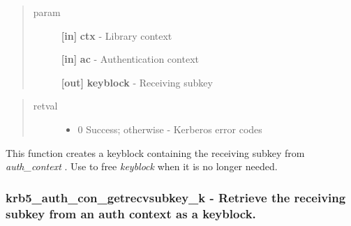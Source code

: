 \documentclass[letterpaper,10pt,english]{sphinxmanual}
\begin{document}
\begin{fulllineitems}
\label{appdev/refs/api/krb5_auth_con_getrecvsubkey:c.krb5_auth_con_getrecvsubkey}
\end{fulllineitems}

\begin{quote}\begin{description}
\item[{param}] \leavevmode
\textbf{{[}in{]}} \textbf{ctx} - Library context

\textbf{{[}in{]}} \textbf{ac} - Authentication context

\textbf{{[}out{]}} \textbf{keyblock} - Receiving subkey

\end{description}\end{quote}
\begin{quote}\begin{description}
\item[{retval}] \leavevmode\begin{itemize}
\item {} 
0   Success; otherwise - Kerberos error codes

\end{itemize}

\end{description}\end{quote}

This function creates a keyblock containing the receiving subkey from \emph{auth\_context} . Use {\hyperref[appdev/refs/api/krb5_free_keyblock:c.krb5_free_keyblock]{}} to free \emph{keyblock} when it is no longer needed.


\subsubsection{krb5\_auth\_con\_getrecvsubkey\_k -  Retrieve the receiving subkey from an auth context as a keyblock.}
\label{appdev/refs/api/krb5_auth_con_getrecvsubkey_k:krb5-auth-con-getrecvsubkey-k-retrieve-the-receiving-subkey-from-an-auth-context-as-a-keyblock}\label{appdev/refs/api/krb5_auth_con_getrecvsubkey_k::doc}
\end{document}
